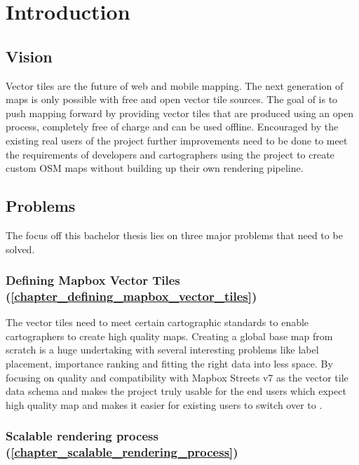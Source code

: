 \chapter{Introduction}

\section{Vision}\label{part1_vision}

Vector tiles are the future of web and mobile mapping. The next generation of maps is only possible
with free and open vector tile sources. The goal of \osmvt{} is to push mapping forward by providing
vector tiles that are produced using an open process, completely free of charge and can be used offline.
Encouraged by the existing real users of the project further improvements need to be done to meet the requirements of developers and cartographers using the project to create custom OSM maps without building up their own rendering pipeline.


\section{Problems}\label{goals}

The focus off this bachelor thesis lies on three major problems that need to be solved.

\subsection*{Defining Mapbox Vector Tiles (\autoref{chapter_defining_mapbox_vector_tiles})}\label{intro_carto_standards}

 The vector tiles need to meet certain cartographic standards to enable cartographers to create high quality maps. Creating a global base map from scratch is a huge undertaking with several interesting problems like label placement, importance ranking and fitting the right data into less space. By focusing on quality and compatibility with Mapbox Streets v7 as the vector tile data schema and makes the project truly usable for the end users which expect high quality map and makes it easier for existing users to switch over to \osmvt{}.

\subsection*{Scalable rendering process (\autoref{chapter_scalable_rendering_process})}\label{scalable-rendering-process}

